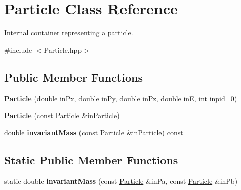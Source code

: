 \hypertarget{struct_particle}{\section{Particle Class Reference}
\label{struct_particle}
}


Internal container representing a particle.  




{\ttfamily \#include $<$Particle.\-hpp$>$}

\subsection*{Public Member Functions}
\begin{DoxyCompactItemize}
\item 
\hypertarget{struct_particle_abc1277b6ac392f87bdb03df3c782e799}{{\bfseries Particle} (double in\-Px, double in\-Py, double in\-Pz, double in\-E, int inpid=0)}\label{struct_particle_abc1277b6ac392f87bdb03df3c782e799}

\item 
\hypertarget{struct_particle_ab6007fd3a3794808270afceb50d52df0}{{\bfseries Particle} (const \hyperlink{struct_particle}{Particle} \&in\-Particle)}\label{struct_particle_ab6007fd3a3794808270afceb50d52df0}

\item 
\hypertarget{struct_particle_a9b1160ecde77b56dd41adf591af897d4}{double {\bfseries invariant\-Mass} (const \hyperlink{struct_particle}{Particle} \&in\-Particle) const }\label{struct_particle_a9b1160ecde77b56dd41adf591af897d4}

\end{DoxyCompactItemize}
\subsection*{Static Public Member Functions}
\begin{DoxyCompactItemize}
\item 
\hypertarget{struct_particle_a1369d604579dea453eea62660ab759bf}{static double {\bfseries invariant\-Mass} (const \hyperlink{struct_particle}{Particle} \&in\-Pa, const \hyperlink{struct_particle}{Particle} \&in\-Pb)}\label{struct_particle_a1369d604579dea453eea62660ab759bf}

\end{DoxyCompactItemize}
